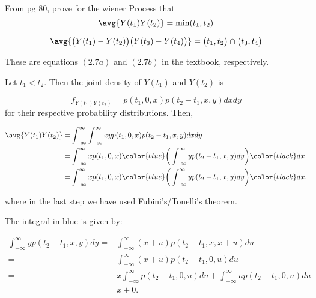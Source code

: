 

From pg 80, prove for the wiener Process that
\begin{equation*}
\avg{Y(t_1) Y(t_2)} = \min(t_1, t_2)
\end{equation*}

\begin{equation*}
\avg{ \big( Y(t_1) - Y(t_2) \big)  \big( Y(t_3) - Y(t_4) \big) } = \big( t_1, t_2 \big) \cap \big( t_3, t_4 \big)
\end{equation*}

These are equations $(2.7a)$ and $(2.7b)$ in the textbook, respectively.


Let $t_1 < t_2$. Then the joint density of $Y (t_1)$ and  $Y (t_2)$ is 

\begin{equation*}
f_{Y (t_1)Y(t_2)} = p(t_1, 0, x)p(t_2 - t_1, x, y)dxdy
\end{equation*}
for their respective probability distributions. Then, 




\begin{align*}
\avg{Y(t_1)Y(t_2)} =& \int_{-\infty}^{\infty} \int_{-\infty}^{\infty} x y p(t_1, 0, x)p(t_2 - t_1, x, y)dxdy \\
= & \int_{-\infty}^{\infty} x p(t_1, 0, x) \color{blue} \bigg( \int_{-\infty}^{\infty} y p(t_2 - t_1, x, y)dy \bigg) \color{black} dx\\
= & \int_{-\infty}^{\infty} x p(t_1, 0, x) \color{blue} \bigg( \int_{-\infty}^{\infty} y p(t_2 - t_1, x, y)dy \bigg) \color{black} dx .
\end{align*}

where in the last step we have used Fubini's/Tonelli's theorem. 

The integral in blue is given by: 

\begin{align*}
\int_{-\infty}^{\infty} y p(t_2 - t_1, x, y)dy =& \int_{-\infty}^{\infty} (x + u) p(t_2 - t_1, x, x + u)du \\
= & \int_{-\infty}^{\infty} (x + u) p(t_2 - t_1, 0, u)du \\
= & x\int_{-\infty}^{\infty} p(t_2 - t_1, 0, u)du + \int_{-\infty}^{\infty} u p(t_2 - t_1, 0, u)du \\
= & x + 0 .
\end{align*}

